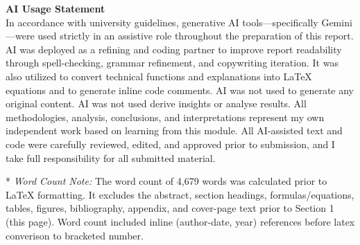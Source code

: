 \documentclass[12pt, a4paper]{article}
\begin{document}
\begin{titlepage}
    \begin{minipage}{0.92\textwidth}
        \small
        \textbf{AI Usage Statement}\\[0.3em]
        In accordance with university guidelines, generative AI tools---specifically Gemini---were used strictly in an assistive role throughout the preparation of this report. AI was deployed as a refining and coding partner to improve report readability through spell-checking, grammar refinement, and copywriting iteration. It was also utilized to convert technical functions and explanations into \LaTeX{} equations and to generate inline code comments. AI was not used to generate any original content. AI was not used derive insights or analyse results. All methodologies, analysis, conclusions, and interpretations represent my own independent work based on learning from this module. All AI-assisted text and code were carefully reviewed, edited, and approved prior to submission, and I take full responsibility for all submitted material.
    \end{minipage}

    \vfill
    
    \begin{minipage}{0.92\textwidth}
        \tiny
        \color{gray}
        * \textit{Word Count Note:} The word count of 4,679 words was calculated prior to \LaTeX{} formatting. It excludes the abstract, section headings, formulas/equations, tables, figures, bibliography, appendix, and cover-page text prior to Section 1 (this page). Word count included inline (author-date, year) references before latex converison to bracketed number.
    \end{minipage}
    
\end{titlepage}

\newpage
{} %

\tableofcontents
\newpage

\listoftables
\vspace{1cm}

\end{document}
